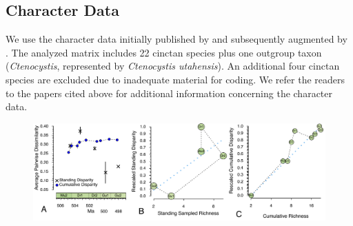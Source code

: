 \documentclass{article}
\begin{document}
\subsection{Character Data}
We use the character data initially published by \citep{SmithZamora2009} and subsequently augmented by \citep{ZamoraRahmanSmith2013}.  The analyzed matrix includes 22 cinctan species plus one outgroup taxon (\textit{Ctenocystis}, represented by \textit{Ctenocystis utahensis}). An additional four cinctan species are excluded due to inadequate material for coding.  We refer the readers to the papers cited above for additional information concerning the character data.
\begin{figure}
  \includegraphics[width=\textwidth]{figures/Cinctan Disparity 3Ways Horizontal.pdf}


\end{figure}
\end{document}
